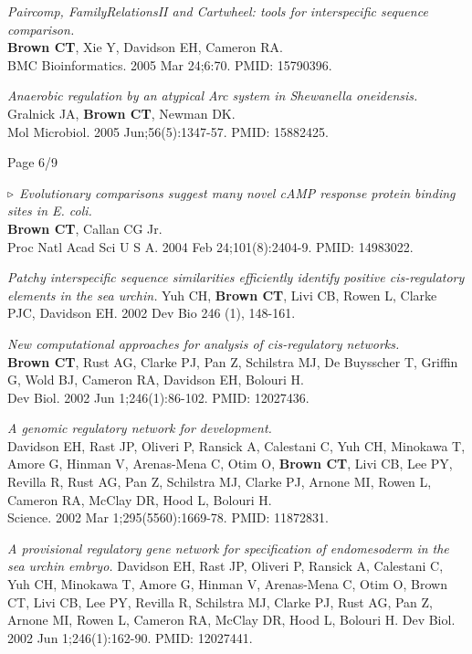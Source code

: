 \documentclass[margin,line]{resume}
\begin{document}
\begin{resume}
{\em Paircomp, FamilyRelationsII and Cartwheel: tools for interspecific sequence comparison.}\\
{\bf Brown CT}, Xie Y, Davidson EH, Cameron RA.\\
BMC Bioinformatics. 2005 Mar 24;6:70.
PMID: 15790396.

{\em Anaerobic regulation by an
atypical Arc system in {\em Shewanella oneidensis}.}\\
Gralnick JA, {\bf Brown CT}, Newman DK.\\
Mol Microbiol. 2005
Jun;56(5):1347-57.  PMID: 15882425.

\vspace{2cm}
{\centerline {Page 6/9}}

\newpage

{\color{red} ${\bf \triangleright}$}
{\em Evolutionary comparisons suggest
many novel cAMP response protein binding sites in {\em E. coli}.}\\
{\bf Brown CT}, Callan CG Jr.\\
Proc Natl Acad Sci U S A. 2004 Feb 24;101(8):2404-9.  PMID: 14983022.

{\em Patchy interspecific sequence similarities efficiently identify positive cis-regulatory elements in the sea urchin.}
Yuh CH, {\bf Brown CT}, Livi CB, Rowen L, Clarke PJC, Davidson EH.
2002 Dev Bio 246 (1), 148-161.

  {\em New
computational approaches for analysis of {\em cis}-regulatory networks.}  \\
{\bf Brown CT}, Rust AG, Clarke PJ, Pan Z, Schilstra MJ, De Buysscher
T, Griffin G, Wold BJ, Cameron RA, Davidson EH, Bolouri H.\\
Dev Biol. 2002 Jun 1;246(1):86-102.  PMID: 12027436.

{\em A genomic
regulatory network for development.}\\
Davidson EH, Rast JP, Oliveri P, Ransick A, Calestani C, Yuh CH,
Minokawa T, Amore G, Hinman V, Arenas-Mena C, Otim O, {\bf Brown CT}, Livi
CB, Lee PY, Revilla R, Rust AG, Pan Z, Schilstra MJ, Clarke PJ, Arnone
MI, Rowen L, Cameron RA, McClay DR, Hood L, Bolouri H.
\\Science. 2002 Mar
1;295(5560):1669-78.  PMID: 11872831.

{\em A provisional regulatory gene network for specification of endomesoderm in the sea urchin embryo.}
Davidson EH, Rast JP, Oliveri P, Ransick A, Calestani C, Yuh CH, Minokawa T, Amore G, Hinman V, Arenas-Mena C, Otim O, Brown CT, Livi CB, Lee PY, Revilla R, Schilstra MJ, Clarke PJ, Rust AG, Pan Z, Arnone MI, Rowen L, Cameron RA, McClay DR, Hood L, Bolouri H.
Dev Biol. 2002 Jun 1;246(1):162-90.
PMID: 12027441.


\end{resume}
\end{document}
